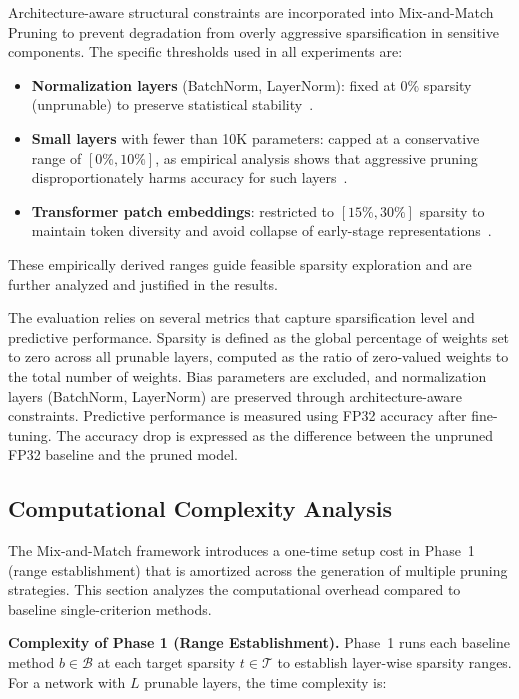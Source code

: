 \documentclass[11pt, conference]{IEEEtran}
\begin{document}
Architecture-aware structural constraints are incorporated into Mix-and-Match Pruning to prevent degradation from overly aggressive sparsification in sensitive components. The specific thresholds used in all experiments are:

\begin{itemize}
    \item \textbf{Normalization layers} (BatchNorm, LayerNorm): fixed at $0\%$ sparsity (unprunable) to preserve statistical stability~\cite{li2017pruning}.
    \item \textbf{Small layers} with fewer than 10K parameters: capped at a conservative range of $[0\%, 10\%]$, as empirical analysis shows that aggressive pruning disproportionately harms accuracy for such layers~\cite{han2015learning}.
    \item \textbf{Transformer patch embeddings}: restricted to $[15\%, 30\%]$ sparsity to maintain token diversity and avoid collapse of early-stage representations~\cite{dosovitskiy2021vit}.
\end{itemize}

These empirically derived ranges guide feasible sparsity exploration and are further analyzed and justified in the results.

The evaluation relies on several metrics that capture sparsification level and predictive performance. Sparsity is defined as the global percentage of weights set to zero across all prunable layers, computed as the ratio of zero-valued weights to the total number of weights. Bias parameters are excluded, and normalization layers (BatchNorm, LayerNorm) are preserved through architecture-aware constraints. Predictive performance is measured using FP32 accuracy after fine-tuning. The accuracy drop is expressed as the difference between the unpruned FP32 baseline and the pruned model.

\FloatBarrier
\subsection{Computational Complexity Analysis}
\label{sec:complexity}

The Mix-and-Match framework introduces a one-time setup cost in Phase~1 (range establishment) that is amortized across the generation of multiple pruning strategies. This section analyzes the computational overhead compared to baseline single-criterion methods.

\textbf{Complexity of Phase 1 (Range Establishment).}
Phase~1 runs each baseline method $b \in \mathcal{B}$ at each target sparsity $t \in \mathcal{T}$ to establish layer-wise sparsity ranges. For a network with $L$ prunable layers, the time complexity is:
\end{document}
